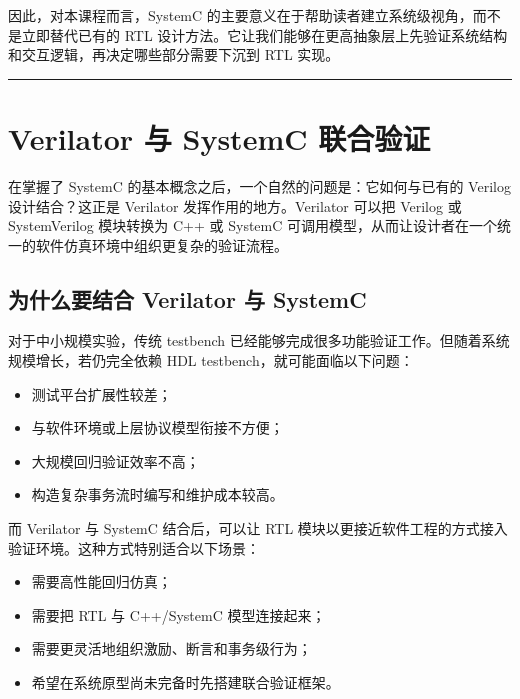 因此，对本课程而言，SystemC
的主要意义在于帮助读者建立系统级视角，而不是立即替代已有的 RTL
设计方法。它让我们能够在更高抽象层上先验证系统结构和交互逻辑，再决定哪些部分需要下沉到
RTL 实现。

\begin{center}\rule{0.5\linewidth}{0.5pt}\end{center}

\section{Verilator 与 SystemC
联合验证}\label{verilator-ux4e0e-systemc-ux8054ux5408ux9a8cux8bc1}

在掌握了 SystemC 的基本概念之后，一个自然的问题是：它如何与已有的
Verilog 设计结合？这正是 Verilator 发挥作用的地方。Verilator 可以把
Verilog 或 SystemVerilog 模块转换为 C++ 或 SystemC
可调用模型，从而让设计者在一个统一的软件仿真环境中组织更复杂的验证流程。

\subsection{为什么要结合 Verilator 与
SystemC}\label{ux4e3aux4ec0ux4e48ux8981ux7ed3ux5408-verilator-ux4e0e-systemc}

对于中小规模实验，传统 testbench
已经能够完成很多功能验证工作。但随着系统规模增长，若仍完全依赖 HDL
testbench，就可能面临以下问题：

\begin{itemize}
\tightlist
\item
  测试平台扩展性较差；
\item
  与软件环境或上层协议模型衔接不方便；
\item
  大规模回归验证效率不高；
\item
  构造复杂事务流时编写和维护成本较高。
\end{itemize}

而 Verilator 与 SystemC 结合后，可以让 RTL
模块以更接近软件工程的方式接入验证环境。这种方式特别适合以下场景：

\begin{itemize}
\tightlist
\item
  需要高性能回归仿真；
\item
  需要把 RTL 与 C++/SystemC 模型连接起来；
\item
  需要更灵活地组织激励、断言和事务级行为；
\item
  希望在系统原型尚未完备时先搭建联合验证框架。
\end{itemize}

